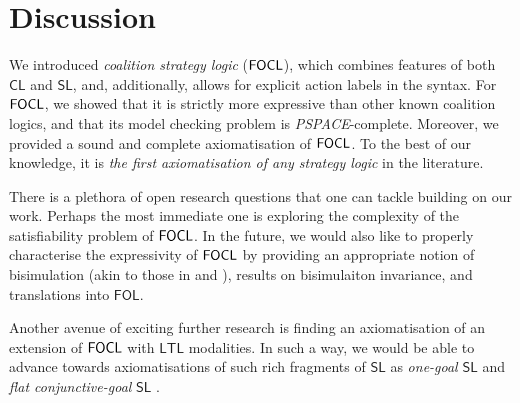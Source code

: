 \documentclass[sigconf,anonymous]{aamas}
\begin{document}
    

\section{Discussion}
\label{sec:conclusion}

We introduced \textit{coalition strategy logic} ($\mathsf{FOCL}$), which combines features of both $\mathsf{CL}$ and $\mathsf{SL}$, and, additionally, allows for explicit action labels in the syntax. For $\mathsf{FOCL}$, we showed that it is strictly more expressive than other known coalition logics, and that its model checking problem is \textit{PSPACE}-complete. Moreover, we provided a sound and complete axiomatisation of $\mathsf{FOCL}$. To the best of our knowledge, it is \textit{the first axiomatisation of any strategy logic} in the literature.

There is a plethora of open research questions that one can tackle building on our work. Perhaps the most immediate one is exploring the complexity of the satisfiability problem of $\mathsf{FOCL}$. In the future, we would also like to properly characterise the expressivity of $\mathsf{FOCL}$ by providing an appropriate notion of bisimulation (akin to those in \cite[Chapter 3]{mogavero10thesis} and \cite{belardinelli18}), results on bisimulaiton invariance, and translations into $\mathsf{FOL}$. 

Another avenue of exciting further research is finding an axiomatisation of an extension of $\mathsf{FOCL}$ with $\mathsf{LTL}$ modalities. In such a way, we would be able to advance towards axiomatisations of such rich fragments of $\mathsf{SL}$ as \textit{one-goal} $\mathsf{SL}$ \cite{mogavero16} and \textit{flat conjunctive-goal} $\mathsf{SL}$ \cite{acar19}. 
\end{document}
